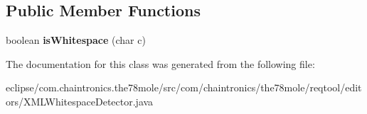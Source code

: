 \subsection*{Public Member Functions}
\begin{DoxyCompactItemize}
\item 
boolean {\bfseries is\+Whitespace} (char c)\hypertarget{classcom_1_1chaintronics_1_1the78mole_1_1reqtool_1_1editors_1_1XMLWhitespaceDetector_abe9d98842ad54c5bf37b251285a250dc}{}\label{classcom_1_1chaintronics_1_1the78mole_1_1reqtool_1_1editors_1_1XMLWhitespaceDetector_abe9d98842ad54c5bf37b251285a250dc}

\end{DoxyCompactItemize}


The documentation for this class was generated from the following file\+:\begin{DoxyCompactItemize}
\item 
eclipse/com.\+chaintronics.\+the78mole/src/com/chaintronics/the78mole/reqtool/editors/X\+M\+L\+Whitespace\+Detector.\+java\end{DoxyCompactItemize}
